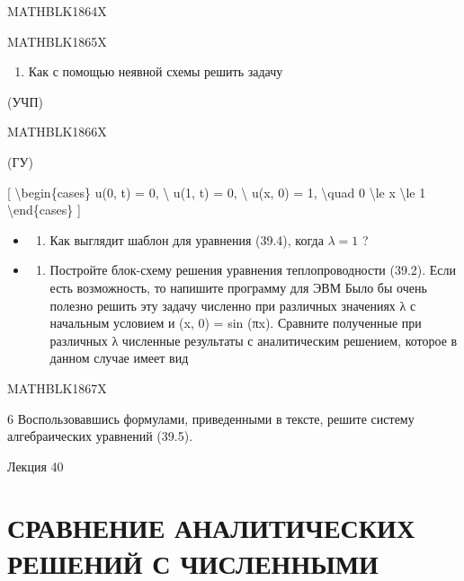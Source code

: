 \documentclass[
]{article}
\providecommand{\tightlist}{%
  \setlength{\itemsep}{0pt}\setlength{\parskip}{0pt}}
\begin{document}
MATHBLK1864X

MATHBLK1865X

\begin{enumerate}
\def\labelenumi{\arabic{enumi}.}
\setcounter{enumi}{2}
\tightlist
\item
  Как с помощью неявной схемы решить задачу
\end{enumerate}

(УЧП)

MATHBLK1866X

(ГУ)

{[} \textbackslash begin\{cases\} u(0, t) = 0, \textbackslash{} u(1, t)
= 0, \textbackslash{} u(x, 0) = 1, \textbackslash quad 0
\textbackslash le x \textbackslash le 1 \textbackslash end\{cases\} {]}

\begin{itemize}
\tightlist
\item
  \begin{enumerate}
  \def\labelenumi{\arabic{enumi}.}
  \setcounter{enumi}{3}
  \tightlist
  \item
    Как выглядит шаблон для уравнения (39.4), когда \(\lambda = 1\) ?
  \end{enumerate}
\item
  \begin{enumerate}
  \def\labelenumi{\arabic{enumi}.}
  \setcounter{enumi}{4}
  \tightlist
  \item
    Постройте блок-схему решения уравнения теплопроводности (39.2). Если
    есть возможность, то напишите программу для ЭВМ Было бы очень
    полезно решить эту задачу численно при различных значениях λ с
    начальным условием и (x, 0) = sin (πx). Сравните полученные при
    различных λ численные результаты с аналитическим решением, которое в
    данном случае имеет вид
  \end{enumerate}
\end{itemize}

MATHBLK1867X

6 Воспользовавшись формулами, приведенными в тексте, решите систему
алгебраических уравнений (39.5).

Лекция 40

\section{СРАВНЕНИЕ АНАЛИТИЧЕСКИХ РЕШЕНИЙ С
ЧИСЛЕННЫМИ}\label{ux441ux440ux430ux432ux43dux435ux43dux438ux435-ux430ux43dux430ux43bux438ux442ux438ux447ux435ux441ux43aux438ux445-ux440ux435ux448ux435ux43dux438ux439-ux441-ux447ux438ux441ux43bux435ux43dux43dux44bux43cux438}
\end{document}
